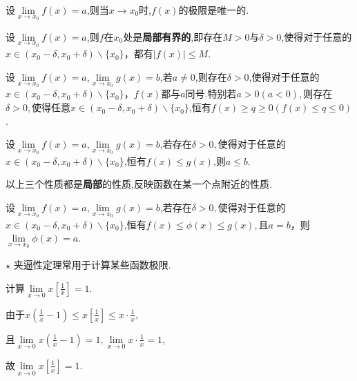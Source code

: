 	\begin{theorem}
		设$\lim\limits_{x\to x_0}f(x)=a$,则当$x\to x_0$时,$f(x)$的极限是唯一的.
	\end{theorem}
	
	\begin{theorem}
		设$\lim\limits_{x\to x_0}f(x)=a$,则$f$在$x_0$处是\textbf{局部有界的},即存在$M>0$与$\delta >0$,使得对于任意的$x\in \left(x_0-\delta,x_0+\delta \right)\backslash \{x_0\}$，都有$\left|f(x)\right| \le M$.
	\end{theorem}

	\begin{theorem}
		设$\lim\limits_{x\to x_0}f(x)=a$,$\lim\limits_{x\to x_0}g(x)=b$,若$a\ne 0$,则存在$\delta >0$,使得对于任意的$x\in \left(x_0-\delta,x_0+\delta \right)\backslash \{x_0\}，f(x)$都与$a$同号.特别若$a>0\left(a<0 \right),$则存在$\delta >0,$使得任意$x\in \left(x_0-\delta,x_0+\delta \right)\backslash \{x_0\}$,恒有$f(x)\ge q \ge 0\left(f(x) \le q \le 0\right)$.
	\end{theorem}

	\begin{theorem}
		设$\lim\limits_{x\to x_0}f(x)=a$,$\lim\limits_{x\to x_0}g(x)=b$,若存在$\delta>0,$使得对于任意的$x\in \left(x_0-\delta,x_0+\delta \right)\backslash \{x_0\}$,恒有$f(x)\le g(x)$,则$a\le b$.
	\end{theorem}	
	以上三个性质都是\textbf{局部}的性质,反映函数在某一个点附近的性质.
	
	\begin{theorem}
		设$\lim\limits_{x\to x_0}f(x)=a$,$\lim\limits_{x\to x_0}g(x)=b$,若存在$\delta>0,$使得对于任意的$x\in \left(x_0-\delta,x_0+\delta \right)\backslash \{x_0\}$,恒有$f(x) \le \phi(x) \le g(x),$且$a=b$，则$\lim\limits_{x\to x_0}\phi (x)=a$.
	\end{theorem}
	$\star$ 夹逼性定理常用于计算某些函数极限.
	\begin{example}
		计算$\lim\limits_{x\to 0}x\left[\frac{1}{x}\right]=1$.
	\end{example}
	\begin{solution}
		由于$x(\frac{1}{x}-1)\le x\left[\frac{1}{x}\right]\le x\cdot \frac{1}{x}$,
		
		且$\lim\limits_{x\to 0}x(\frac{1}{x}-1)=1,\lim\limits_{x\to 0}x\cdot \frac{1}{x}=1$,
		
		故$\lim\limits_{x\to 0}x\left[\frac{1}{x}\right]=1$.
	\end{solution}
	
